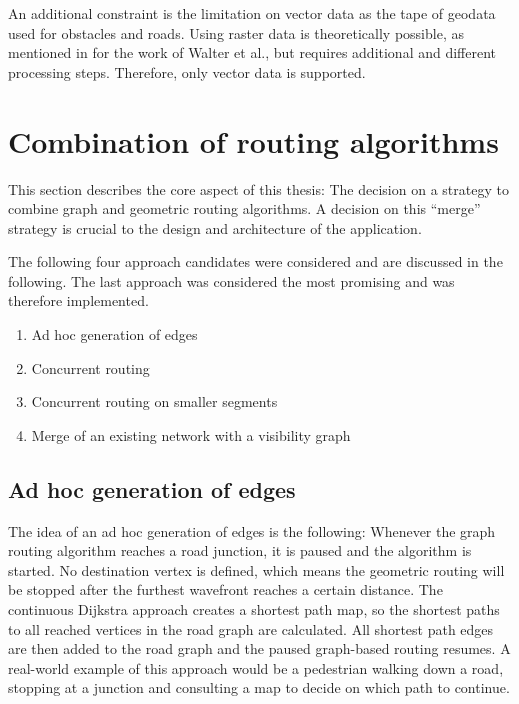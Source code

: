 		An additional constraint is the limitation on vector data as the tape of geodata used for obstacles and roads.
		Using raster data is theoretically possible, as mentioned in  for the work of Walter et al., but requires additional and different processing steps.
		Therefore, only vector data is supported.
	
\section{Combination of routing algorithms}
\label{sec:combining-routing-algorithms}

	This section describes the core aspect of this thesis:
	The decision on a strategy to combine graph and geometric routing algorithms.
	A decision on this \enquote{merge} strategy is crucial to the design and architecture of the application.
	
	The following four approach candidates were considered and are discussed in the following.
	The last approach was considered the most promising and was therefore implemented.
	\begin{enumerate}
		\item Ad hoc generation of edges
		\item Concurrent routing
		\item Concurrent routing on smaller segments
		\item Merge of an existing network with a visibility graph
	\end{enumerate}
	
	\subsection{Ad hoc generation of edges}
	
		The idea of an ad hoc generation of edges is the following:
		Whenever the graph routing algorithm reaches a road junction, it is paused and the  algorithm is started.
		No destination vertex is defined, which means the geometric routing will be stopped after the furthest wavefront reaches a certain distance.
		The continuous Dijkstra approach creates a shortest path map, so the shortest paths to all reached vertices in the road graph are calculated.
		All shortest path edges are then added to the road graph and the paused graph-based routing resumes.
		A real-world example of this approach would be a pedestrian walking down a road, stopping at a junction and consulting a map to decide on which path to continue.
		

